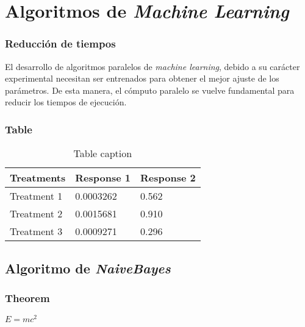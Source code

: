\documentclass{beamer}
\begin{document}
\section{Algoritmos de \textit{Machine Learning}}

\begin{frame}
\frametitle{Reducción de tiempos}
El desarrollo de algoritmos paralelos de \textit{machine learning}, debido a su carácter experimental
necesitan ser entrenados para obtener el mejor ajuste de los parámetros. De esta manera, el cómputo
paralelo se vuelve fundamental para reducir los tiempos de ejecución.
\end{frame}


\begin{frame}
\frametitle{Table}
\begin{table}
\begin{tabular}{l l l}
\toprule
\textbf{Treatments} & \textbf{Response 1} & \textbf{Response 2}\\
\midrule
Treatment 1 & 0.0003262 & 0.562 \\
Treatment 2 & 0.0015681 & 0.910 \\
Treatment 3 & 0.0009271 & 0.296 \\
\bottomrule
\end{tabular}
\caption{Table caption}
\end{table}
\end{frame}

\subsection{Algoritmo de \textit{NaiveBayes}}

\begin{frame}
\frametitle{Theorem}
\begin{theorem}
$E = mc^2$
\end{theorem}
\end{frame}

\end{document}
